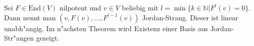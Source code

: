 \documentclass[8pt, a4paper, twocolumn, landscape]{article}
\newcommand{\comment}[1]{}
\begin{document}
\begin{definition}
Sei $F \in \mathrm{End}(V)$ nilpotent und $v \in V$ beliebig mit $l = \min \{k \in \mathbb{N} |F^l(v) = 0\}$. Dann nennt man
$
(v, F(v), ..., F^{l-1}(v))
$
Jordan-Strang. Dieser ist linear unabh"angig. Im n"achsten Theorem wird Existenz einer Basis aus Jordan-Str"angen gezeigt.
\end{definition}

\comment{
\begin{theorem}
Sei $G$ ein nilpotenter Endomorphismus eines K-Vektorraums $V$ und $d$ minimal, so dass $G^d = 0$. Dann gibt es eindeutig bestimmte Zahlen $s_1, ..., s_d \in \mathbb{N}$ mit 
$$d \cdot s_d +(d - 1)s_{d-1} + ... + s_l = \mathrm{dim} V$$
und eine Basis $\mathcal{B}$ von $V,$, so dass 
$$M_\mathcal{B}(G) =
\left( \begin{array}{ccc} J_d^{\oplus s_d}(0) & & \\ & \ddots & \\ & & J_1^{\oplus s_1}(0) 

\end{array} \right)
$$
\comment{
$$
\left( \begin{array}{cccccccccc}
{J_{d}} & {} & {} & {} & {} & {} & {} & {} & {} & {}
\\ {} & {\ddots} & {} & {} & {} & {} & {} & {} & {0} & {}
\\ {} & {} & {J_{d}} & {} & {} & {} & {} & {} & {} & {}
\\ {} & {} & {} & {J_{d-1}} & {} & {} & {} & {} & {} & {}
\\ {} & {} & {} & {} & {}\ddots & {} & {} & {} & {} & {}
\\ {} & {} & {} & {} & {} & {J_{d-1}} & {} & {} & {} & {}
\\ {} & {} & {} & {} & {} & {} & {\ddots} & {} & {} & {}
\\ {} & {} & {} & {} & {} & {} & {} & {J_{l}} & {} & {}
\\ {} & {0} & {} & {} & {} & {} & {} & {} & {\ddots} & {}
\\ {} & {} & {} & {} & {} & {} & {} & {} & {} & {J_{l}}
\end{array} 
\right),$$
\\wobei $J_d$ $s_d$-mal, $J_{d-1}$ $s_{d-1}$-mal, ... und $J_l$ $s_1$-mal vorkommt.
}

\end{theorem}
}
\end{document}
